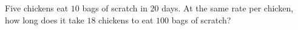 Five chickens eat $10$ bags of scratch in $20$ days. At the same rate per chicken, how long does it take $18$ chickens to eat $100$ bags of scratch?
